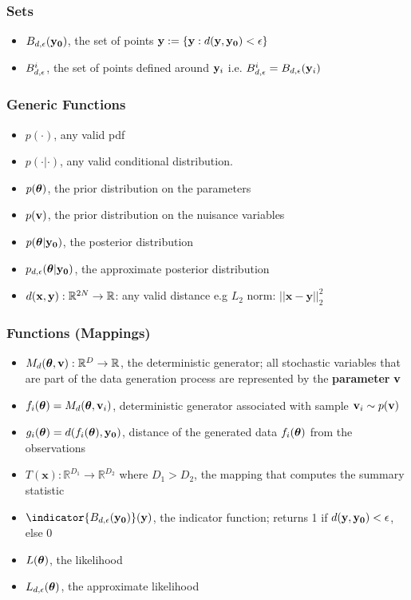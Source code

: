 \subsubsection*{Sets}
\label{sec:sets}

\begin{itemize}
\item $B_{d,\epsilon}(\mathbf{y_0})$, the set of points $\mathbf{y} := \{\mathbf{y}: d(\mathbf{y}, \mathbf{y_0}) < \epsilon \}$
\item $B_{d,\epsilon}^i$, the set of points defined around $\mathbf{y}_i$ i.e. $B_{d,\epsilon}^i = B_{d,\epsilon}(\mathbf{y}_i)$
\end{itemize}
    
\subsubsection*{Generic Functions}
\label{sec:generic-functions}

\begin{itemize}
\item $p(\cdot)$, any valid pdf
\item $p(\cdot | \cdot)$, any valid conditional distribution.
\item $p(\boldsymbol{\theta})$, the prior distribution on the parameters
\item $p(\mathbf{v})$, the prior distribution on the nuisance variables
\item $p(\boldsymbol{\theta}|\mathbf{y_0})$, the posterior distribution
\item $p_{d,\epsilon}(\boldsymbol{\theta}|\mathbf{y_0})$, the approximate posterior
  distribution  
\item $d(\mathbf{x}, \mathbf{y}): \mathbb{R}^{2N} \rightarrow \mathbb{R}$: any valid
  distance e.g $L_2$ norm: $||\mathbf{x}-\mathbf{y}||_2^2$
\end{itemize}

\subsubsection*{Functions (Mappings)}
\label{sec:functions-mappings}

\begin{itemize}
\item $M_d(\boldsymbol{\theta}, \mathbf{v}): \mathbb{R}^D \rightarrow \mathbb{R}$, the deterministic
  generator; all stochastic variables that are part of the data generation process are represented by the \textbf{parameter} $\mathbf{v}$
\item $f_i(\boldsymbol{\theta}) = M_d(\boldsymbol{\theta}, \mathbf{v}_i)$, deterministic generator associated with sample $\mathbf{v}_i \sim p(\mathbf{v})$
\item $g_i(\boldsymbol{\theta}) = d(f_i(\boldsymbol{\theta}), \mathbf{y_0})$, distance of the generated data $f_i(\boldsymbol{\theta})$ from the observations
\item $T(\mathbf{x}): \mathbb{R}^{D_1} \rightarrow \mathbb{R}^{D_2}$
  where $D_1 > D_2$, the mapping that computes the summary statistic
\item $\indicator{\region(\data)}(\yb)$, the indicator function; returns 1 if $d(\mathbf{y}, \mathbf{y_0})<\epsilon$, else 0
\item $L(\boldsymbol{\theta})$, the likelihood
\item $L_{d,\epsilon}(\boldsymbol{\theta})$, the approximate likelihood
\end{itemize}

